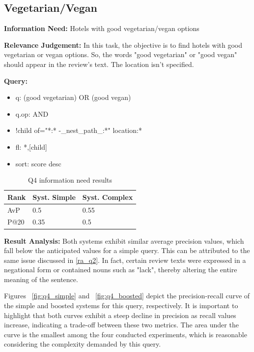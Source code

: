\documentclass[sigconf]{acmart}
\begin{document}
\subsection{Vegetarian/Vegan}

\textbf{Information Need:} Hotels with good vegetarian/vegan options

\textbf{Relevance Judgement:} In this task, the objective is to find hotels with good vegetarian or vegan options. So, the words "good vegetarian" or "good vegan" should appear in the review's text. The location isn't specified.

\textbf{Query:}

\begin{itemize}
    \item q: (good vegetarian) OR (good vegan)
    \item q.op: AND
    \item {!child of="*:* -\_nest\_path\_:*"} location:*
    \item fl: *,[child]
    \item sort: score desc
\end{itemize}

\begin{table}[h]
\caption{Q4 information need results}
\label{tab:q4}
\begin{tabular}{lll}
\toprule
Rank & Syst. Simple & Syst. Complex\\
\midrule
AvP & 0.5 & 0.55  \\
P@20 & 0.35 & 0.5 \\
\bottomrule
\end{tabular}
\end{table}


\textbf{Result Analysis:} Both systems exhibit similar average precision values, which fall below the anticipated values for a simple query. This can be attributed to the same issue discussed in \ref{ra_q2}. In fact, certain review texts were expressed in a negational form or contained nouns such as "lack", thereby altering the entire meaning of the sentence.

Figures ~\ref{fig:q4_simple} and ~\ref{fig:q4_boosted} depict the precision-recall curve of the simple and boosted systems for this query, respectively. It is important to highlight that both curves exhibit a steep decline in precision as recall values increase, indicating a trade-off between these two metrics. The area under the curve is the smallest among the four conducted experiments, which is reasonable considering the complexity demanded by this query.
\end{document}
